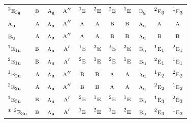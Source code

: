 \documentclass[10pt,a4paper]{article}
\numberwithin{equation}{section}
\newcommand{\irr}[1]{\text{\normalfont\scshape #1}}
\newcommand{\conjpair}[1]{{}^{#1}}
\newcommand{\ptag}[1]{\mathrm{#1}}
\begin{document}
{\begin{longtable}{@{}lcccccccccc@{}}
$\conjpair{2}\irr{e}_{3\ptag{g}}$ & $\irr{b}$ & $\irr{a}_{\ptag{g}}$ & $\irr{a}''$ & $\conjpair{1}\irr{e}$ & $\conjpair{2}\irr{e}$ & $\conjpair{2}\irr{e}$ & $\conjpair{1}\irr{e}$ & $\irr{b}_{\ptag{g}}$ & $\conjpair{2}\irr{e}_{3}$ & $\conjpair{1}\irr{e}_{3}$\\
$\irr{a}_{\ptag{u}}$ & $\irr{a}$ & $\irr{a}_{\ptag{u}}$ & $\irr{a}''$ & $\irr{a}$ & $\irr{a}$ & $\irr{b}$ & $\irr{b}$ & $\irr{a}_{\ptag{u}}$ & $\irr{a}$ & $\irr{a}$\\
$\irr{b}_{\ptag{u}}$ & $\irr{a}$ & $\irr{a}_{\ptag{u}}$ & $\irr{a}''$ & $\irr{a}$ & $\irr{a}$ & $\irr{b}$ & $\irr{b}$ & $\irr{a}_{\ptag{u}}$ & $\irr{b}$ & $\irr{b}$\\
$\conjpair{1}\irr{e}_{1\ptag{u}}$ & $\irr{b}$ & $\irr{a}_{\ptag{u}}$ & $\irr{a}'$ & $\conjpair{1}\irr{e}$ & $\conjpair{2}\irr{e}$ & $\conjpair{1}\irr{e}$ & $\conjpair{2}\irr{e}$ & $\irr{b}_{\ptag{u}}$ & $\conjpair{1}\irr{e}_{1}$ & $\conjpair{2}\irr{e}_{1}$\\
$\conjpair{2}\irr{e}_{1\ptag{u}}$ & $\irr{b}$ & $\irr{a}_{\ptag{u}}$ & $\irr{a}'$ & $\conjpair{2}\irr{e}$ & $\conjpair{1}\irr{e}$ & $\conjpair{2}\irr{e}$ & $\conjpair{1}\irr{e}$ & $\irr{b}_{\ptag{u}}$ & $\conjpair{2}\irr{e}_{1}$ & $\conjpair{1}\irr{e}_{1}$\\
$\conjpair{1}\irr{e}_{2\ptag{u}}$ & $\irr{a}$ & $\irr{a}_{\ptag{u}}$ & $\irr{a}''$ & $\irr{b}$ & $\irr{b}$ & $\irr{a}$ & $\irr{a}$ & $\irr{a}_{\ptag{u}}$ & $\conjpair{1}\irr{e}_{2}$ & $\conjpair{2}\irr{e}_{2}$\\
$\conjpair{2}\irr{e}_{2\ptag{u}}$ & $\irr{a}$ & $\irr{a}_{\ptag{u}}$ & $\irr{a}''$ & $\irr{b}$ & $\irr{b}$ & $\irr{a}$ & $\irr{a}$ & $\irr{a}_{\ptag{u}}$ & $\conjpair{2}\irr{e}_{2}$ & $\conjpair{1}\irr{e}_{2}$\\
$\conjpair{1}\irr{e}_{3\ptag{u}}$ & $\irr{b}$ & $\irr{a}_{\ptag{u}}$ & $\irr{a}'$ & $\conjpair{2}\irr{e}$ & $\conjpair{1}\irr{e}$ & $\conjpair{2}\irr{e}$ & $\conjpair{1}\irr{e}$ & $\irr{b}_{\ptag{u}}$ & $\conjpair{1}\irr{e}_{3}$ & $\conjpair{2}\irr{e}_{3}$\\*
$\conjpair{2}\irr{e}_{3\ptag{u}}$ & $\irr{b}$ & $\irr{a}_{\ptag{u}}$ & $\irr{a}'$ & $\conjpair{1}\irr{e}$ & $\conjpair{2}\irr{e}$ & $\conjpair{1}\irr{e}$ & $\conjpair{2}\irr{e}$ & $\irr{b}_{\ptag{u}}$ & $\conjpair{2}\irr{e}_{3}$ & $\conjpair{1}\irr{e}_{3}$\\
\bottomrule\end{longtable}}
\end{document}

